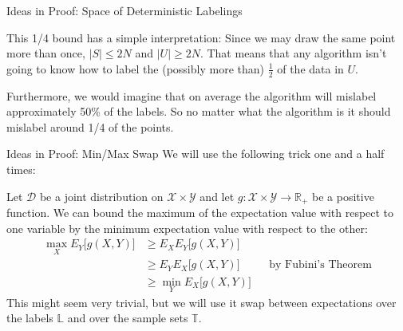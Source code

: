 \documentclass[10pt, table, dvipsnames,handout]{beamer}
\newcommand{\cD}{\ensuremath{\mathcal{D}}}
\newcommand{\cX}{\ensuremath{\mathcal{X}}}
\newcommand{\cY}{\ensuremath{\mathcal{Y}}}
\newcommand{\bR}{\ensuremath{\mathbb{R}}}
\begin{document}
\begin{frame}[fragile]{Ideas in Proof: Space of Deterministic Labelings}
\begin{minipage}[t][0.4\textheight][t]{\textwidth}
  \end{minipage}
  \vfill
  \begin{minipage}[t][0.6\textheight][t]{\textwidth}
This 1/4 bound has a simple interpretation: Since we may draw the same point more than once, $|S|\leq 2N$ and $|U|\geq 2N$. That means that any algorithm isn't going to know how to label the (possibly more than) $\frac12$ of the data in $U$. \pause 

Furthermore, we would imagine that on average the algorithm will mislabel approximately 50\% of the labels. So no matter what the algorithm is it should mislabel around 1/4 of the points. 


\end{minipage}

\end{frame}



\begin{frame}[fragile]{Ideas in Proof: Min/Max Swap}
 We will use the following trick one and a half times: 

Let $\cD$ be a joint distribution on $\mathcal{X}\times\cY$ and let $g:\cX\times \cY\to \bR_+$ be a positive function.  We can bound the maximum of the expectation value with respect to one variable by the minimum expectation value with respect to the other:\pause
\begin{align*}
\max_{X} E_{Y}\big[ g(X,Y) \big] &\geq E_{X} E_{Y}\big[ g(X,Y) \big]   
\\
&\geq E_{Y} E_{X}\big[ g(X,Y) \big]   && \text{by Fubini's Theorem}
\\
&\geq 
\min_{Y} E_{X}\big[ g(X,Y) \big] 
\end{align*}\pause
This might seem very trivial, but we will use it swap between expectations over the labels $\mathbb{L}$ and over the sample sets $\mathbb{T}$. 
\end{frame}
\end{document}
